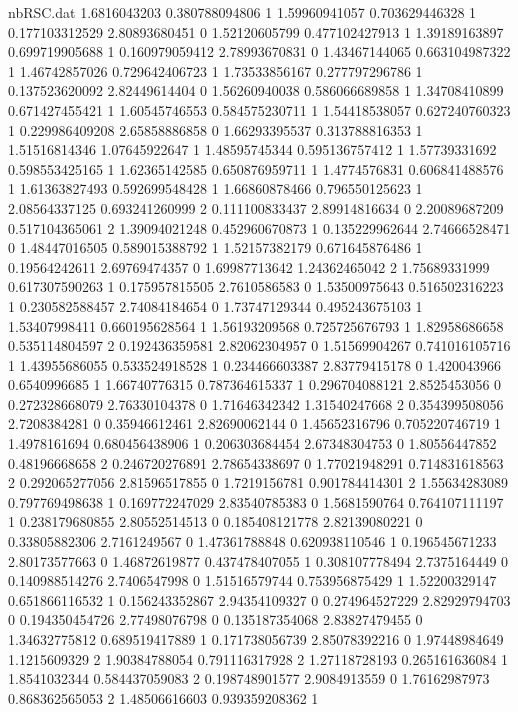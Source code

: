\begin{filecontents}{nbRSC.dat}
1.6816043203 0.380788094806 1
1.59960941057 0.703629446328 1
0.177103312529 2.80893680451 0
1.52120605799 0.477102427913 1
1.39189163897 0.699719905688 1
0.160979059412 2.78993670831 0
1.43467144065 0.663104987322 1
1.46742857026 0.729642406723 1
1.73533856167 0.277797296786 1
0.137523620092 2.82449614404 0
1.56260940038 0.586066689858 1
1.34708410899 0.671427455421 1
1.60545746553 0.584575230711 1
1.54418538057 0.627240760323 1
0.229986409208 2.65858886858 0
1.66293395537 0.313788816353 1
1.51516814346 1.07645922647 1
1.48595745344 0.595136757412 1
1.57739331692 0.598553425165 1
1.62365142585 0.650876959711 1
1.4774576831 0.606841488576 1
1.61363827493 0.592699548428 1
1.66860878466 0.796550125623 1
2.08564337125 0.693241260999 2
0.111100833437 2.89914816634 0
2.20089687209 0.517104365061 2
1.39094021248 0.452960670873 1
0.135229962644 2.74666528471 0
1.48447016505 0.589015388792 1
1.52157382179 0.671645876486 1
0.19564242611 2.69769474357 0
1.69987713642 1.24362465042 2
1.75689331999 0.617307590263 1
0.175957815505 2.7610586583 0
1.53500975643 0.516502316223 1
0.230582588457 2.74084184654 0
1.73747129344 0.495243675103 1
1.53407998411 0.660195628564 1
1.56193209568 0.725725676793 1
1.82958686658 0.535114804597 2
0.192436359581 2.82062304957 0
1.51569904267 0.741016105716 1
1.43955686055 0.533524918528 1
0.234466603387 2.83779415178 0
1.420043966 0.6540996685 1
1.66740776315 0.787364615337 1
0.296704088121 2.8525453056 0
0.272328668079 2.76330104378 0
1.71646342342 1.31540247668 2
0.354399508056 2.7208384281 0
0.35946612461 2.82690062144 0
1.45652316796 0.705220746719 1
1.4978161694 0.680456438906 1
0.206303684454 2.67348304753 0
1.80556447852 0.48196668658 2
0.246720276891 2.78654338697 0
1.77021948291 0.714831618563 2
0.292065277056 2.81596517855 0
1.7219156781 0.901784414301 2
1.55634283089 0.797769498638 1
0.169772247029 2.83540785383 0
1.5681590764 0.764107111197 1
0.238179680855 2.80552514513 0
0.185408121778 2.82139080221 0
0.33805882306 2.7161249567 0
1.47361788848 0.620938110546 1
0.196545671233 2.80173577663 0
1.46872619877 0.437478407055 1
0.308107778494 2.7375164449 0
0.140988514276 2.7406547998 0
1.51516579744 0.753956875429 1
1.52200329147 0.651866116532 1
0.156243352867 2.94354109327 0
0.274964527229 2.82929794703 0
0.194350454726 2.77498076798 0
0.135187354068 2.83827479455 0
1.34632775812 0.689519417889 1
0.171738056739 2.85078392216 0
1.97448984649 1.1215609329 2
1.90384788054 0.791116317928 2
1.27118728193 0.265161636084 1
1.8541032344 0.584437059083 2
0.198748901577 2.9084913559 0
1.76162987973 0.868362565053 2
1.48506616603 0.939359208362 1

\end{filecontents}
